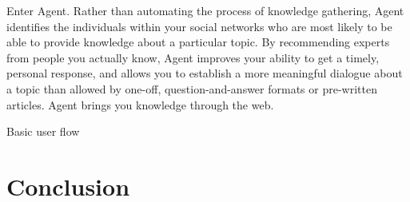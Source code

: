 \documentclass[11pt]{article}
\begin{document}
Enter Agent. Rather than automating the process of knowledge gathering, Agent
identifies the individuals within your social networks who are most likely to be
able to provide knowledge about a particular topic. By recommending experts
from people you actually know, Agent improves your ability to get a timely,
personal response, and allows you to establish a more meaningful dialogue about
a topic than allowed by one-off, question-and-answer formats or pre-written
articles. Agent brings you knowledge through the web.







Basic user flow

\section{Conclusion}
\label{sec:conclusion}



\end{document}
